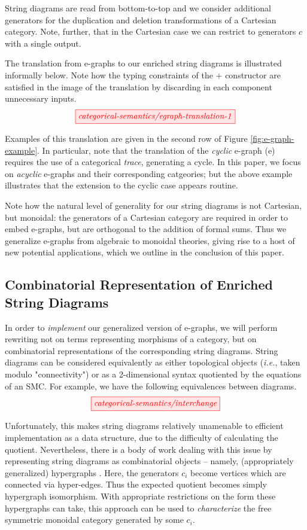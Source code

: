 String diagrams are read from bottom-to-top and we consider additional generators for the duplication and deletion transformations of a Cartesian category.  Note, further, that in the Cartesian case we can restrict to generators $c$ with a single output. 

The translation from e-graphs to our enriched string diagrams is illustrated informally below. 
Note how the typing constraints of the $+$ constructor are satisfied in the image of the translation by discarding in each component unnecessary inputs.
\[
    \tikzfig{categorical-semantics/egraph-translation-1}
\]

Examples of this translation are given in the second row of Figure \ref{fig:e-graph-example}. In particular, note that the translation of the \textit{cyclic} e-graph (e)
requires the use of a categorical \textit{trace}, generating a cycle. In this paper, we focus on \textit{acyclic} e-graphs and their corresponding catgeories; but the above example illustrates that the extension to the cyclic case appears routine.

Note how the natural level of generality for our string diagrams is not Cartesian, but monoidal: the generators of a Cartesian category are required in order to embed e-graphs, but are orthogonal to the addition of formal sums. Thus we generalize e-graphs from algebraic to monoidal theories, giving rise to a  host of new potential applications, which we outline in the conclusion of this paper.   

\subsection{Combinatorial Representation of Enriched String Diagrams}

In order to \textit{implement} our generalized version of e-graphs, we will  perform rewriting not on terms representing morphisms of a category, but on combinatorial representations of the corresponding string diagrams.  String diagrams can be considered equivalently as either topological objects (\textit{i.e.}, taken modulo "connectivity") or as a 2-dimensional syntax quotiented by the equations of an SMC. For example, we have the following equivalences between diagrams. 
\[
	\tikzfig{categorical-semantics/interchange}
\]

Unfortunately, this makes string diagrams relatively unamenable to efficient implementation as a data structure, due to the difficulty of calculating the quotient. 
Nevertheless, there is a body of work dealing with this issue by representing string diagrams as combinatorial objects -- namely, (appropriately generalized) hypergraphs 
\cite{bonchi_string_2022-1,bonchi_string_2022-2,bonchi_string_2022}.  Here, the generators $c_i$ become vertices which are connected via hyper-edges.  Thus the expected quotient becomes simply hypergraph isomorphism.  With appropriate restrictions on the form these hypergraphs can take, this approach can be used to \textit{characterize} the free symmetric monoidal category generated by some $c_i$. 

